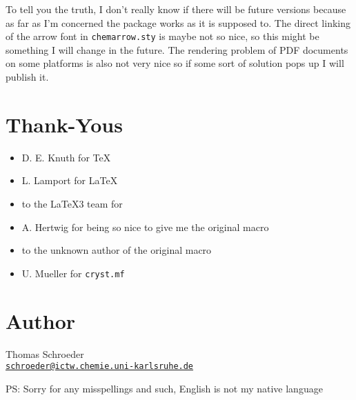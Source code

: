 \documentclass[DIV=9, pagesize=auto]{scrartcl}
\newcommand*{\mail}[1]{\href{mailto:#1}{\texttt{#1}}}
\newcommand*{\pkg}[1]{\textsf{#1}}
\begin{document}
To tell you the truth, I don't really know if there will be future versions 
because as far as I'm concerned the package works as it is supposed to. 
The direct linking of the \pkg{arrow} font in \texttt{chemarrow.sty} is maybe not so nice, 
so this might be something I will change in the future. The rendering 
problem of PDF documents on some platforms is also not very nice so if 
some sort of solution pops up I will publish it.


\section{Thank-Yous}

\begin{itemize}
\item D. E. Knuth for \TeX
\item L. Lamport for \LaTeX
\item to the \LaTeX3 team for \LaTeXe
\item A. Hertwig for being so nice to give me the original macro
\item to the unknown author of the original macro
\item U. Mueller for \texttt{cryst.mf}
\end{itemize}


\section{Author}

Thomas Schroeder\\
\mail{schroeder@ictw.chemie.uni-karlsruhe.de}

PS: Sorry for any misspellings and such, English is not my native 
language \smiley
\end{document}
